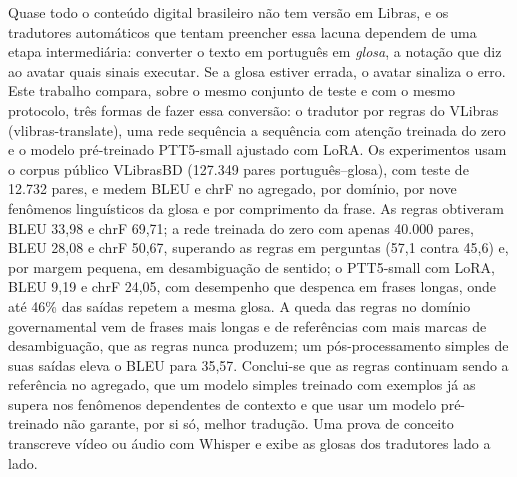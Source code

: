 \documentclass[12pt]{article}
\newcommand{\gl}[1]{\textsf{\small #1}}
\begin{document}
\begin{resumo}
Quase todo o conteúdo digital brasileiro não tem versão em Libras, e os tradutores automáticos que tentam preencher essa lacuna dependem de uma etapa intermediária: converter o texto em português em \emph{glosa}, a notação que diz ao avatar quais sinais executar. Se a glosa estiver errada, o avatar sinaliza o erro. Este trabalho compara, sobre o mesmo conjunto de teste e com o mesmo protocolo, três formas de fazer essa conversão: o tradutor por regras do VLibras (\gl{vlibras-translate}), uma rede sequência a sequência com atenção treinada do zero e o modelo pré-treinado PTT5-small ajustado com LoRA. Os experimentos usam o corpus público VLibrasBD (127.349 pares português--glosa), com teste de 12.732 pares, e medem BLEU e chrF no agregado, por domínio, por nove fenômenos linguísticos da glosa e por comprimento da frase. As regras obtiveram BLEU 33,98 e chrF 69,71; a rede treinada do zero com apenas 40.000 pares, BLEU 28,08 e chrF 50,67, superando as regras em perguntas (57,1 contra 45,6) e, por margem pequena, em desambiguação de sentido; o PTT5-small com LoRA, BLEU 9,19 e chrF 24,05, com desempenho que despenca em frases longas, onde até 46\% das saídas repetem a mesma glosa. A queda das regras no domínio governamental vem de frases mais longas e de referências com mais marcas de desambiguação, que as regras nunca produzem; um pós-processamento simples de suas saídas eleva o BLEU para 35,57. Conclui-se que as regras continuam sendo a referência no agregado, que um modelo simples treinado com exemplos já as supera nos fenômenos dependentes de contexto e que usar um modelo pré-treinado não garante, por si só, melhor tradução. Uma prova de conceito transcreve vídeo ou áudio com Whisper e exibe as glosas dos tradutores lado a lado.
\end{resumo}

\begin{abstract}
Most Brazilian digital content has no version in Libras (Brazilian Sign Language). Automatic translators first convert Portuguese text into \emph{gloss}, the notation that drives a signing avatar. We compare three ways of performing this step under the same test set and protocol: the rule-based VLibras translator, a sequence-to-sequence LSTM with attention trained from scratch, and the pretrained PTT5-small fine-tuned with LoRA. On the public VLibrasBD corpus (127,349 pairs; 12,732 test pairs), rules reach BLEU 33.98 / chrF 69.71, the scratch model 28.08 / 50.67 with only 40,000 training pairs (but wins on questions and sense disambiguation), and PTT5+LoRA 9.19 / 24.05, collapsing on long sentences. Rules remain the aggregate reference, and a pretrained model alone does not guarantee better translation.
\end{abstract}
\end{document}
